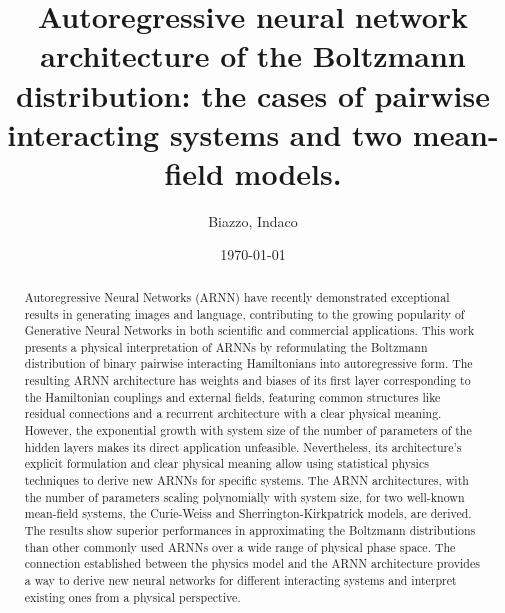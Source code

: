 \documentclass[aps,physrev,10pt,floatfix,reprint]{revtex4-2}
\begin{document}
\title{Autoregressive neural network architecture of the Boltzmann distribution: the cases of pairwise interacting systems and two mean-field models.}
\author{Biazzo, Indaco}
\date{\today}

\begin{abstract}
    Autoregressive Neural Networks (ARNN) have recently demonstrated exceptional results in generating images and language, contributing to the growing popularity of Generative Neural Networks in both scientific and commercial applications. This work presents a physical interpretation of ARNNs by reformulating the Boltzmann distribution of binary pairwise interacting Hamiltonians into autoregressive form. The resulting ARNN architecture has weights and biases of its first layer corresponding to the Hamiltonian couplings and external fields, featuring common structures like residual connections and a recurrent architecture with a clear physical meaning. However, the exponential growth with system size of the number of parameters of the hidden layers makes its direct application unfeasible. Nevertheless, its architecture's explicit formulation and clear physical meaning allow using statistical physics techniques to derive new ARNNs for specific systems. The ARNN architectures, with the number of parameters scaling polynomially with system size, for two well-known mean-field systems, the Curie-Weiss and Sherrington-Kirkpatrick models, are derived. The results show superior performances in approximating the Boltzmann distributions than other commonly used ARNNs over a wide range of physical phase space. The connection established between the physics model and the ARNN architecture provides a way to derive new neural networks for different interacting systems and interpret existing ones from a physical perspective.


\end{abstract}
\end{document}

